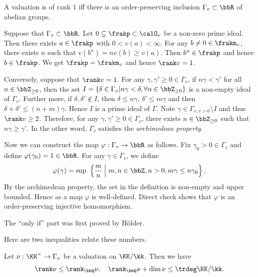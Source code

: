 \begin{example}
	A valuation is of rank $1$ iff there is an order-preserving inclusion $\Gamma_v \subset \bbR$ of abelian groups.

	Suppose that $\Gamma_v \subset \bbR$.
	Let $0 \subsetneq \frakp \subset \calO_v$ be a non-zero prime ideal.
	Then there exists $a \in \frakp$ with $0<v(a)<\infty$.
	For any $b \neq 0 \in \frakm_v$, there exists $n$ such that $v(b^n) = nv(b) \geq v(a)$.
	Then $b^n \in \frakp$ and hence $b \in \frakp$.
	We get $\frakp = \frakm_v$ and hence $\rank v = 1$.

	Conversely, suppose that $\rank v = 1$.
	For any $\gamma,\gamma' \geq 0 \in \Gamma_v$, if $n \gamma < \gamma'$ for all $n \in \bbZ_{\geq 0}$, then the set $I = \{\delta \in \Gamma_v | n \gamma < \delta, \forall n \in \bbZ_{\geq 0} \}$ is a non-empty ideal of $\Gamma_v$.
	Further more, if $\delta,\delta' \notin I$, then $\delta \leq n\gamma$, $\delta' \leq m \gamma$ and then $\delta+\delta' \leq (n+m) \gamma$.
	Hence $I$ is a prime ideal of $\Gamma$.
	Note $\gamma \in \Gamma_{v, v> 0} \setminus I$ and thus $\rank v \geq 2$.
	Therefore, for any $\gamma,\gamma' \geq 0 \in \Gamma_v$, there exists $n \in \bbZ_{\geq 0}$ such that $n \gamma \geq \gamma'$.
	In the other word, $\Gamma_v$ satisfies the \emph{archimedean property}.

	Now we can construct the map $\varphi: \Gamma_v \to \bbR$ as follows.
	Fix $\gamma_0 > 0 \in \Gamma_v$ and define $\varphi(\gamma_0) = 1 \in \bbR$.
	For any $\gamma \in \Gamma_v$, we define
	\[ \varphi(\gamma) = \sup\ \left\{ \frac{m}{n} \;\middle|\; m,n \in \bbZ, n > 0,  m\gamma \leq n\gamma_0\right\}. \]
	By the archimedean property, the set in the definition is non-empty and upper bounded.
	Hence as a map $\varphi$ is well-defined.
	Direct check shows that $\varphi$ is an order-preserving injective homomorphism.

	The ``only if'' part was first proved by H\"older.
\end{example}

Here are two inequalities relate these numbers.

\begin{theorem}\label{thm:inequalities_of_numbers_of_valuations}
	Let $\nu: \KK^\times \to \Gamma_\nu$ be a valuation on $\KK/\kk$.
	Then we have
	\[ \rank \nu \leq \rank_\bbQ \nu, \quad \rank_\bbQ \nu + \dim \nu \leq \trdeg \KK/\kk. \]
\end{theorem}


